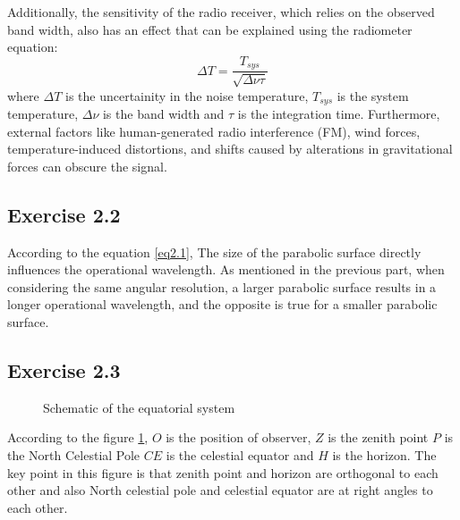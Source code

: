\documentclass[12pt]{article}
\begin{document}
 Additionally, the sensitivity of the radio receiver, which relies on the observed band width, also has an effect that can be explained using the radiometer equation\parencite{radiometereq}:
 \begin{equation}
 \label{eq2.3}
 \Delta T = \dfrac{T_{sys}}{\sqrt{\Delta\nu \tau}}
 \end{equation}
 where $\Delta T$ is the uncertainity in the noise temperature, $T_{sys}$ is the system temperature, $\Delta \nu$ is the band width and $\tau$ is the integration time. Furthermore, external factors like human-generated radio interference (FM), wind forces, temperature-induced distortions, and shifts caused by alterations in gravitational forces can obscure the signal\parencite{Tools}.


 \subsection{Exercise 2.2}
 According to the equation \ref{eq2.1}, The size of the parabolic surface directly influences the operational wavelength. As mentioned in the previous part, when considering the same angular resolution, a larger parabolic surface results in a longer operational wavelength, and the opposite is true for a smaller parabolic surface.

 \subsection{Exercise 2.3}

 \begin{figure}[H]
 \centering
 \caption{Schematic of the equatorial system}
 \label{fig2.1}
 \end{figure}

 According to the figure \ref{fig2.1}, $O$ is the position of observer, $Z$ is the zenith point $P$ is the North Celestial Pole $CE$ is the celestial equator and $H$ is the horizon. The key point in this figure is that zenith point and horizon are orthogonal to each other and also North celestial pole and celestial equator are at right angles to each other.
\end{document}
